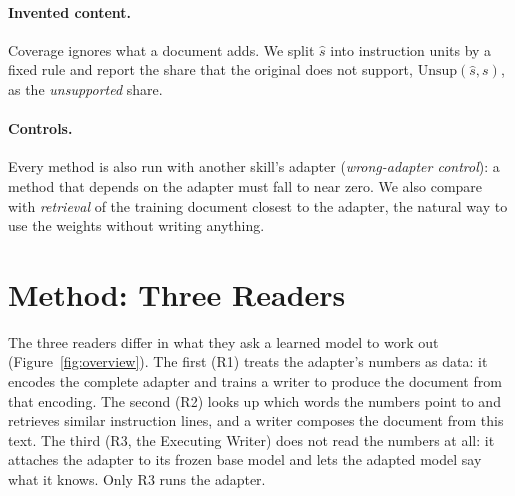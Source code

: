 \documentclass[11pt]{article}
\begin{document}
\paragraph{Invented content.} Coverage ignores what a document adds. We split $\hat s$ into instruction units by a fixed rule and report the
share that the original does not support, $\mathrm{Unsup}(\hat s,s)$, as the \emph{unsupported} share.

\paragraph{Controls.} Every method is also run with another skill's adapter (\emph{wrong-adapter control}): a method that depends on the adapter
must fall to near zero. We also compare with \emph{retrieval} of the training document closest to the adapter, the natural way to use the weights
without writing anything.

\section{Method: Three Readers}
\label{sec:method}

The three readers differ in what they ask a learned model to work out (Figure~\ref{fig:overview}). The first (R1) treats the adapter's numbers
as data: it encodes the complete adapter and trains a writer to produce the document from that encoding. The second (R2) looks up which words
the numbers point to and retrieves similar instruction lines, and a writer composes the document from this text. The third (R3, the Executing
Writer) does not read the numbers at all: it attaches the adapter to its frozen base model and lets the adapted model say what it knows. Only
R3 runs the adapter.
\end{document}
